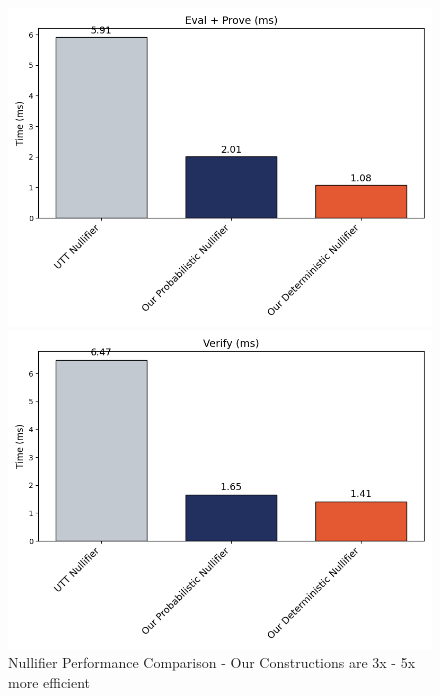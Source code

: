 \begin{figure}[ht]
    \begin{minipage}{0.48\textwidth}
        \centering
         \includegraphics[width=\textwidth]{figures/chap4_private_nullifier_eval_prove.png}        
    \end{minipage}
    \hfill
    \begin{minipage}{0.48\textwidth}
        \centering
       \includegraphics[width=\textwidth]{figures/chap4_private_nullifier_verify.png}
    \end{minipage}
    
    \caption[Our Nullifier Constructions are 3x - 5x more efficient]{Nullifier Performance Comparison - Our Constructions are 3x - 5x more efficient}
    \label{fig:chap4_public_vrf}
\end{figure}






















